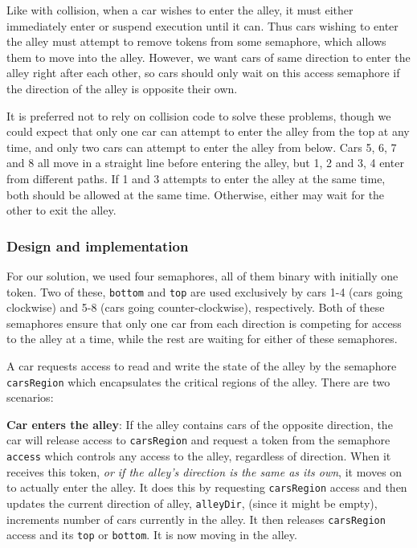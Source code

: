 Like with collision, when a car wishes to enter the alley, it must either immediately enter or suspend execution until it can. Thus cars wishing to enter the alley must attempt to remove tokens from some semaphore, which allows them to move into the alley. However, we want cars of same direction to enter the alley right after each other, so cars should only wait on this access semaphore if the direction of the alley is opposite their own.

It is preferred not to rely on collision code to solve these problems, though we could expect that only one car can attempt to enter the alley from the top at any time, and only two cars can attempt to enter the alley from below. Cars 5, 6, 7 and 8 all move in a straight line before entering the alley, but 1, 2 and 3, 4 enter from different paths. If 1 and 3 attempts to enter the alley at the same time, both should be allowed at the same time. Otherwise, either may wait for the other to exit the alley.

\subsubsection{Design and implementation}
For our solution, we used four semaphores, all of them binary with initially one token. Two of these, \texttt{bottom} and \texttt{top} are used exclusively by cars 1-4 (cars going clockwise) and 5-8 (cars going counter-clockwise), respectively. Both of these semaphores ensure that only one car from each direction is competing for access to the alley at a time, while the rest are waiting for either of these semaphores.

A car requests access to read and write the state of the alley by the semaphore \texttt{carsRegion} which encapsulates the critical regions of the alley. There are two scenarios:

\textbf{Car enters the alley}: If the alley contains cars of the opposite direction, the car will release access to \texttt{carsRegion} and request a token from the semaphore \texttt{access} which controls any access to the alley, regardless of direction. When it receives this token, \emph{or if the alley's direction is the same as its own}, it moves on to actually enter the alley. It does this by requesting \texttt{carsRegion} access and then updates the current direction of alley, \texttt{alleyDir}, (since it might be empty), increments number of cars currently in the alley. It then releases \texttt{carsRegion} access and its \texttt{top} or \texttt{bottom}. It is now moving in the alley.

